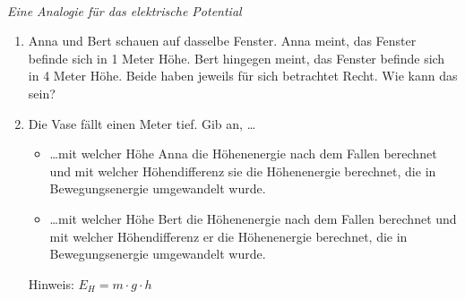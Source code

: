 \documentclass[ngerman, 11pt]{scrreprt}
\begin{document}
	~\vspace{\baselineskip}
	\begin{aufgabe*} \emph{Eine Analogie für das elektrische Potential}
		
		\begin{enumerate}[label=\alph*), itemsep=0ex, parsep=0ex]
			\item Anna und Bert schauen auf dasselbe Fenster. %
			Anna meint, das Fenster befinde sich in 1 Meter Höhe. Bert hingegen meint, das Fenster befinde sich in 4 Meter Höhe. Beide haben jeweils für sich betrachtet Recht. Wie kann das sein?
			\item Die Vase fällt einen Meter tief. Gib an, \dots
			\begin{itemize}[itemsep=0ex]
				\item \dots mit welcher Höhe Anna die Höhenenergie nach dem Fallen berechnet und mit welcher Höhendifferenz sie die Höhenenergie berechnet, die in Bewegungsenergie umgewandelt wurde.
				\item \dots mit welcher Höhe Bert die Höhenenergie nach dem Fallen berechnet und mit welcher Höhendifferenz er die Höhenenergie berechnet, die in Bewegungsenergie umgewandelt wurde.
			\end{itemize}
			
			Hinweis: $E_H=m\cdot g\cdot h$
		\end{enumerate}
	\end{aufgabe*}
	
\end{document}
